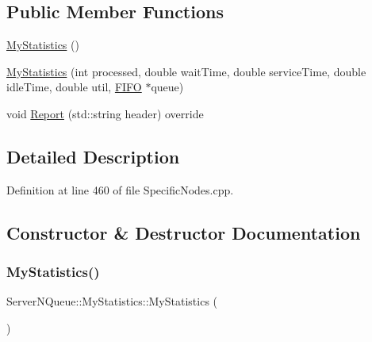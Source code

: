 \subsection*{Public Member Functions}
\begin{DoxyCompactItemize}
\item 
\hyperlink{class_server_n_queue_1_1_my_statistics_a18b48f5f7d68d793a1ba204f183f3d33}{My\+Statistics} ()
\item 
\hyperlink{class_server_n_queue_1_1_my_statistics_ac6ab7a50b89919760fd2eb60a777c1bd}{My\+Statistics} (int processed, double wait\+Time, double service\+Time, double idle\+Time, double util, \hyperlink{class_f_i_f_o}{F\+I\+FO} $\ast$queue)
\item 
void \hyperlink{class_server_n_queue_1_1_my_statistics_ae070c508a1934a43cc167dd6a8917d86}{Report} (std\+::string header) override
\end{DoxyCompactItemize}


\subsection{Detailed Description}


Definition at line 460 of file Specific\+Nodes.\+cpp.



\subsection{Constructor \& Destructor Documentation}
\mbox{\label{class_server_n_queue_1_1_my_statistics_a18b48f5f7d68d793a1ba204f183f3d33}} 
\subsubsection{\texorpdfstring{My\+Statistics()}{MyStatistics()}\hspace{0.1cm}{\footnotesize\ttfamily [1/2]}}
{\footnotesize\ttfamily Server\+N\+Queue\+::\+My\+Statistics\+::\+My\+Statistics (\begin{DoxyParamCaption}{ }\end{DoxyParamCaption})\hspace{0.3cm}{\ttfamily [inline]}}



